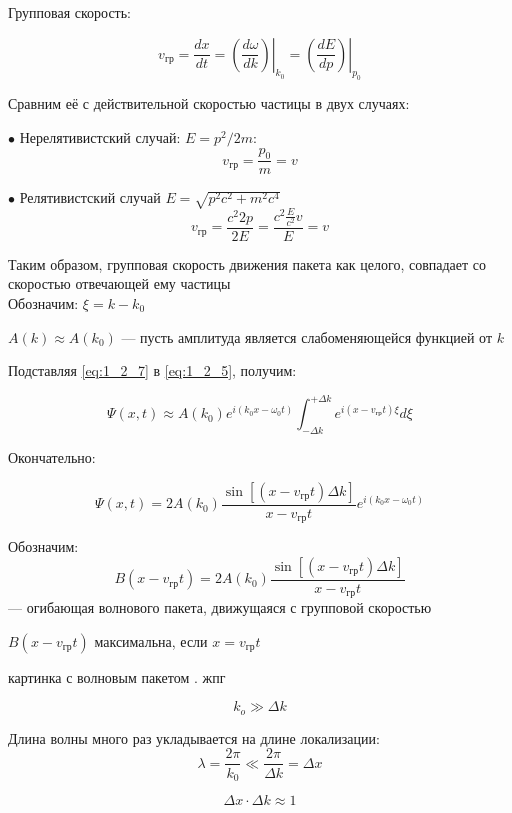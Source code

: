 Групповая скорость:

\begin{equation}
\label{eq:1_2_7}
v_{\text{гр}} = \frac{dx}{dt} = \left . \left ( \frac{d\omega}{dk} \right ) \right |_{k_0} = \left . \left ( \frac{dE}{dp} \right ) \right |_{p_0}
\end{equation}

Сравним её с действительной скоростью частицы в двух случаях:

$\bullet$ Нерелятивистский случай: $E = p^2/{2m}$:\\
$$v_{\text{гр}} = \frac{p_0}{m} = v$$

$\bullet$ Релятивистский случай $E = \sqrt{p^2c^2 + m^2c^4}$\\
$$v_{\text{гр}} = \frac{c^2 2p}{2E} = \frac{c^2 \frac{E}{c^2}v}{E} = v$$

Таким образом, групповая скорость движения пакета как целого, совпадает со скоростью отвечающей ему частицы \\

Обозначим: $\xi = k - k_0$

$A(k) \approx A(k_0)$ --- пусть амплитуда является слабоменяющейся функцией от $k$

Подставляя \eqref{eq:1_2_7} в \eqref{eq:1_2_5}, получим:

$$\Psi(x,t) \approx A(k_0) e^{i(k_0 x - \omega_0 t) }\int^{+ \Delta k}_{ - \Delta k} e^{i(x - v_{\text{гр}}t)\xi} d\xi$$

Окончательно:

\begin{equation}
\label{eq:1_2_8}
\Psi(x,t) = 2 A(k_0) \frac{\sin [(x - v_{\text{гр}}t)\Delta k]}{x - v_{\text{гр}}t}e^{i(k_0 x - \omega_0 t)}
\end{equation}

Обозначим:
$$B(x - v_{\text{гр}}t) =  2 A(k_0) \frac{\sin [(x - v_{\text{гр}}t)\Delta k]}{x - v_{\text{гр}}t}$$ --- огибающая волнового пакета, движущаяся с групповой скоростью

$B(x - v_{\text{гр}}t)$ максимальна, если $x = v_{\text{гр}}t$

картинка с волновым пакетом . жпг

$$k_o \gg \Delta k$$

Длина волны много раз укладывается на длине локализации:\\
$$\lambda = \frac{2 \pi}{k_0} \ll \frac{2 \pi}{\Delta k} = \Delta x$$

\begin{equation}
\label{eq:1_2_9}
\Delta x \cdot \Delta k \approx 1
\end{equation}

